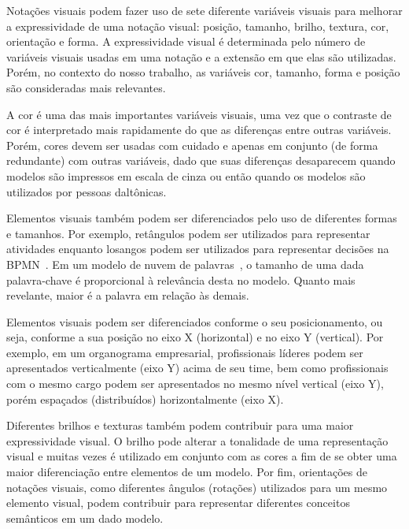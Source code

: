 Notações visuais podem fazer uso de sete diferente variáveis visuais para melhorar a expressividade de uma notação visual: posição, tamanho, brilho, textura, cor, orientação e forma. A expressividade visual é determinada pelo número de variáveis visuais usadas em uma notação e a extensão em que elas são utilizadas. Porém, no contexto do nosso trabalho, as variáveis cor, tamanho, forma e posição são consideradas mais relevantes.

A cor é uma das mais importantes variáveis visuais, uma vez que o contraste de cor é interpretado mais rapidamente do que as diferenças entre outras variáveis. Porém, cores devem ser usadas com cuidado e apenas em conjunto (de forma redundante) com outras variáveis, dado que suas diferenças desaparecem quando modelos são impressos em escala de cinza ou então quando os modelos são utilizados por pessoas daltônicas.

Elementos visuais também podem ser diferenciados pelo uso de diferentes formas e tamanhos. Por exemplo, retângulos podem ser utilizados para representar atividades enquanto losangos podem ser utilizados para representar decisões na BPMN~\cite{OMG-2011-BPMN}. Em um modelo de nuvem de palavras~\cite{HEIMER-LOHMANN-LANGE-ERTL-2014-WORD-CLOUD}, o tamanho de uma dada palavra-chave é proporcional à relevância desta no modelo. Quanto mais revelante, maior é a palavra em relação às demais.


Elementos visuais podem ser diferenciados conforme o seu posicionamento, ou seja, conforme a sua posição no eixo X (horizontal) e no eixo Y (vertical). Por exemplo, em um organograma empresarial, profissionais líderes podem ser apresentados verticalmente (eixo Y) acima de seu time, bem como profissionais com o mesmo cargo podem ser apresentados no mesmo nível vertical (eixo Y), porém espaçados (distribuídos) horizontalmente (eixo X).

Diferentes brilhos e texturas também podem contribuir para uma maior expressividade visual. O brilho pode alterar a tonalidade de uma representação visual e muitas vezes é utilizado em conjunto com as cores a fim de se obter uma maior diferenciação entre elementos de um modelo. Por fim, orientações de notações visuais, como diferentes ângulos (rotações) utilizados para um mesmo elemento visual, podem contribuir para representar diferentes conceitos semânticos em um dado modelo.

